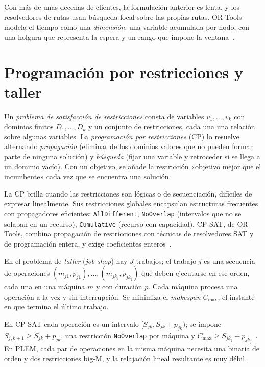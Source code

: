 Con más de unas decenas de clientes, la formulación anterior es lenta, y los resolvedores de rutas usan búsqueda local sobre las propias rutas. OR-Tools modela el tiempo como una \emph{dimensión}: una variable acumulada por nodo, con una holgura que representa la espera y un rango que impone la ventana~\cite{ortools-vrptw}.

\addtocounter{definicion}{1}%

\section{Programación por restricciones y taller}

\begin{definicion}\label{def:csp}
Un \emph{problema de satisfacción de restricciones} consta de variables $v_1,\dots,v_k$ con dominios finitos $D_1,\dots,D_k$ y un conjunto de restricciones, cada una una relación sobre algunas variables. La \emph{programación por restricciones} (CP) lo resuelve alternando \emph{propagación} (eliminar de los dominios valores que no pueden formar parte de ninguna solución) y \emph{búsqueda} (fijar una variable y retroceder si se llega a un dominio vacío). Con un objetivo, se añade la restricción «objetivo mejor que el incumbente» cada vez que se encuentra una solución.
\end{definicion}

La CP brilla cuando las restricciones son lógicas o de secuenciación, difíciles de expresar linealmente. Sus restricciones globales encapsulan estructuras frecuentes con propagadores eficientes: \texttt{AllDifferent}, \texttt{NoOverlap} (intervalos que no se solapan en un recurso), \texttt{Cumulative} (recurso con capacidad). CP-SAT, de OR-Tools, combina propagación de restricciones con técnicas de resolvedores SAT y de programación entera, y exige coeficientes enteros~\cite{ortools-cpsat}.

\begin{definicion}\label{def:jobshop}
En el problema de \emph{taller} (\emph{job-shop}) hay $J$ trabajos; el trabajo $j$ es una secuencia de operaciones $(m_{j1},p_{j1}),\dots,(m_{jk_j},p_{jk_j})$ que deben ejecutarse en ese orden, cada una en una máquina $m$ y con duración $p$. Cada máquina procesa una operación a la vez y sin interrupción. Se minimiza el \emph{makespan} $C_{\max}$, el instante en que termina el último trabajo.
\end{definicion}

En CP-SAT cada operación es un intervalo $[S_{jk},S_{jk}+p_{jk})$; se impone $S_{j,k+1}\ge S_{jk}+p_{jk}$, una restricción \texttt{NoOverlap} por máquina y $C_{\max}\ge S_{jk_j}+p_{jk_j}$~\cite{ortools-js}. En PLEM, cada par de operaciones en la misma máquina necesita una binaria de orden y dos restricciones big-M, y la relajación lineal resultante es muy débil.

